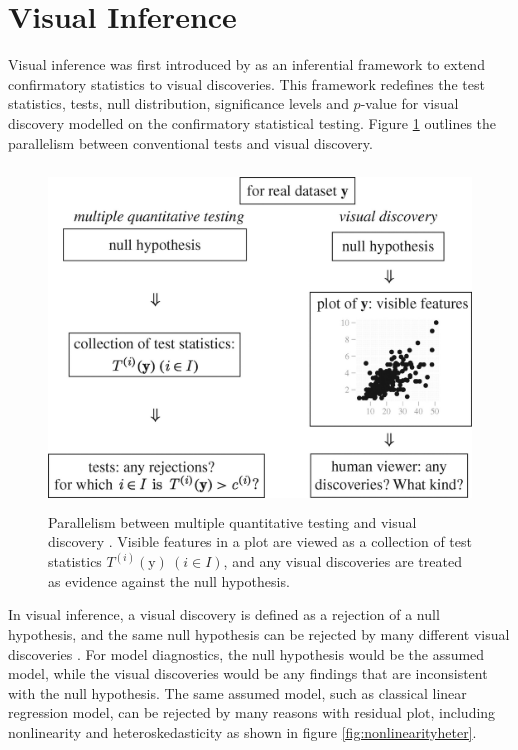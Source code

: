 \documentclass{monashthesis}
\begin{document}
\hypertarget{visual-inference}{%
\section{Visual Inference}\label{visual-inference}}

Visual inference was first introduced by \textcite{buja_statistical_2009} as an inferential framework to extend confirmatory statistics to visual discoveries. This framework redefines the test statistics, tests, null distribution, significance levels and \(p\)-value for visual discovery modelled on the confirmatory statistical testing. Figure \ref{fig:parallelism} outlines the parallelism between conventional tests and visual discovery.

\begin{figure}
\centering
\includegraphics[width=4.6875in,height=3.55208in]{figures/rsta2009012001.jpg}
\caption{Parallelism between multiple quantitative testing and visual discovery \autocite{buja_statistical_2009}. Visible features in a plot are viewed as a collection of test statistics \(T^{(i)}(\boldsymbol{\mathrm{y}})~(i \in I)\), and any visual discoveries are treated as evidence against the null hypothesis. \label{fig:parallelism}}
\end{figure}



In visual inference, a visual discovery is defined as a rejection of a null hypothesis, and the same null hypothesis can be rejected by many different visual discoveries \autocite{buja_statistical_2009}. For model diagnostics, the null hypothesis would be the assumed model, while the visual discoveries would be any findings that are inconsistent with the null hypothesis. The same assumed model, such as classical linear regression model, can be rejected by many reasons with residual plot, including nonlinearity and heteroskedasticity as shown in figure \ref{fig:nonlinearityheter}.
\end{document}
